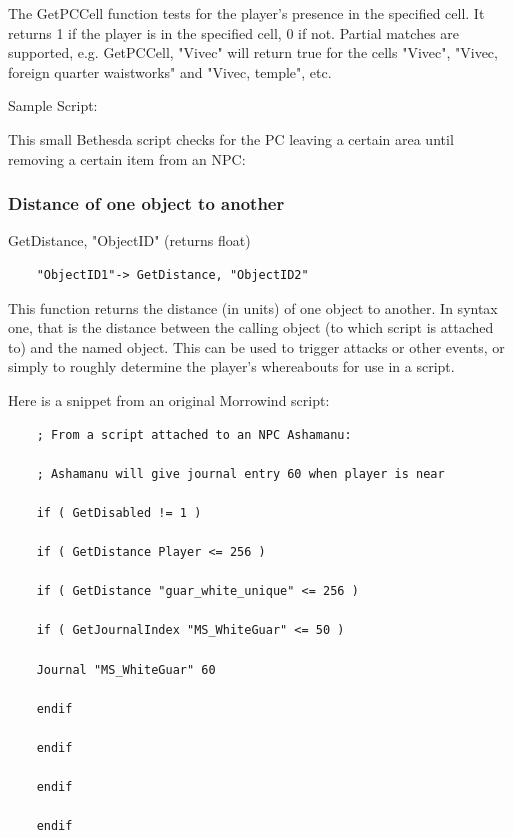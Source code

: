 The GetPCCell function tests for the player's presence in the specified
cell. It returns 1 if the player is in the specified cell, 0 if not.
Partial matches are supported, e.g. GetPCCell, "Vivec" will return true
for the cells "Vivec", "Vivec, foreign quarter waistworks" and "Vivec,
temple", etc.

Sample Script:

This small Bethesda script checks for the PC leaving a certain area
until removing a certain item from an NPC:



\hypertarget{distance-of-one-object-to-another}{%
\subsubsection{Distance of one object to
another}\label{distance-of-one-object-to-another}}

GetDistance, "ObjectID" (returns float)

\begin{lstlisting}
	"ObjectID1"-> GetDistance, "ObjectID2"
\end{lstlisting}

This function returns the distance (in units) of one object to another.
In syntax one, that is the distance between the calling object (to which
script is attached to) and the named object. This can be used to trigger
attacks or other events, or simply to roughly determine the player's
whereabouts for use in a script.

Here is a snippet from an original Morrowind script:

\begin{lstlisting}
	; From a script attached to an NPC Ashamanu:
	
	; Ashamanu will give journal entry 60 when player is near
	
	if ( GetDisabled != 1 )
	
	if ( GetDistance Player <= 256 )
	
	if ( GetDistance "guar_white_unique" <= 256 )
	
	if ( GetJournalIndex "MS_WhiteGuar" <= 50 )
	
	Journal "MS_WhiteGuar" 60
	
	endif
	
	endif
	
	endif
	
	endif
\end{lstlisting}

